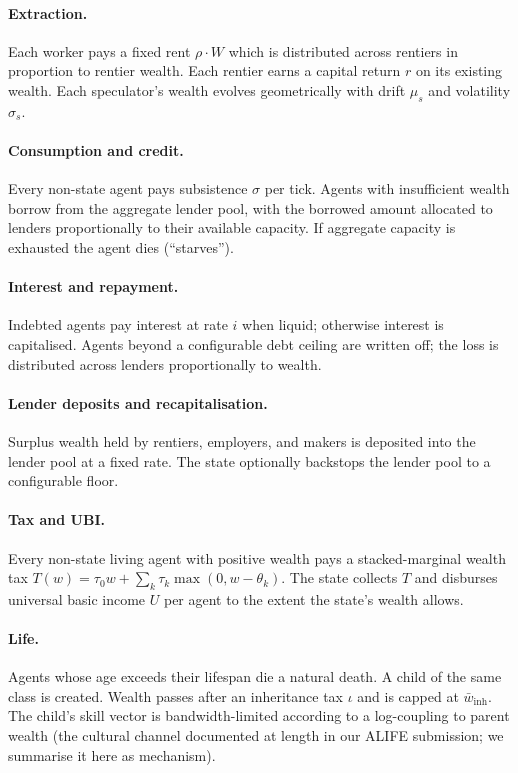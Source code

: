 \documentclass[11pt]{article}
\begin{document}
\paragraph{Extraction.}  Each worker pays a fixed rent
$\rho \cdot W$ which is distributed across rentiers in proportion to
rentier wealth.  Each rentier earns a capital return $r$ on its
existing wealth.  Each speculator's wealth evolves geometrically with
drift $\mu_s$ and volatility $\sigma_s$.

\paragraph{Consumption and credit.}  Every non-state agent pays
subsistence $\sigma$ per tick.  Agents with insufficient wealth borrow
from the aggregate lender pool, with the borrowed amount allocated to
lenders proportionally to their available capacity.  If aggregate
capacity is exhausted the agent dies (``starves'').

\paragraph{Interest and repayment.}  Indebted agents pay interest at
rate $i$ when liquid; otherwise interest is capitalised.  Agents
beyond a configurable debt ceiling are written off; the loss is
distributed across lenders proportionally to wealth.

\paragraph{Lender deposits and recapitalisation.}  Surplus wealth held
by rentiers, employers, and makers is deposited into the lender pool
at a fixed rate.  The state optionally backstops the lender pool to a
configurable floor.

\paragraph{Tax and UBI.}  Every non-state living agent with positive
wealth pays a stacked-marginal wealth tax
$T(w) = \tau_0 w + \sum_k \tau_k \max(0, w - \theta_k)$.
The state collects $T$ and disburses universal basic income $U$ per
agent to the extent the state's wealth allows.

\paragraph{Life.}  Agents whose age exceeds their lifespan die a
natural death.  A child of the same class is created.  Wealth passes
after an inheritance tax $\iota$ and is capped at
$\bar{w}_\text{inh}$.  The child's skill vector is bandwidth-limited
according to a log-coupling to parent wealth (the cultural channel
documented at length in our ALIFE submission; we summarise it here as
mechanism).
\end{document}

